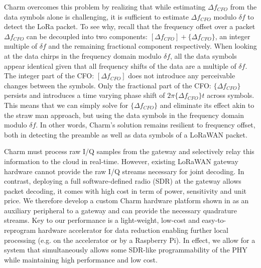 Charm overcomes this problem by realizing that while estimating $\Delta
f_{CFO}$ from the data symbols alone is challenging, it is sufficient to
estimate $\Delta f_{CFO}$ modulo $\delta f$ to detect the LoRa packet. To see
why, recall that the frequency offset over a packet $\Delta f_{CFO}$ can be
decoupled into two components: $[\Delta f_{CFO}] + \{\Delta f_{CFO}\}$, an
integer multiple of $\delta f$ and the remaining fractional component
respectively. When looking at the data chirps in the frequency domain modulo
$\delta f$, all the data symbols appear identical given that all frequency
shifts of the data are a multiple of $\delta f$. The integer part of the CFO:
$[\Delta f_{CFO}]$ does not introduce any perceivable changes between the
symbols. Only the fractional part of the CFO: $\{\Delta f_{CFO}\}$ persists
and introduces a time varying phase shift of $2 \pi \{\Delta f_{CFO}\} t$
across symbols. This means that we can simply solve for $\{\Delta f_{CFO}\}$
and eliminate its effect akin to the straw man approach, but using the data
symbols in the frequency domain modulo $\delta f$. In other words, Charm's
solution remains resilient to frequency offset, both in detecting the preamble
as well as data symbols of a LoRaWAN packet.

Charm must process raw I/Q samples from the gateway and selectively relay this
information to the cloud in real-time. However, existing LoRaWAN gateway
hardware cannot provide the raw I/Q streams necessary for joint decoding. In
contrast, deploying a full software-defined radio (SDR) at the gateway allows
packet decoding, it comes with high cost in term of power, sensitivity and
unit price. We therefore develop a custom Charm hardware platform shown in
 as an auxiliary peripheral to a gateway and can
provide the necessary quadrature streams. Key to our performance is a
light-weight, low-cost and easy-to-reprogram hardware accelerator for data
reduction enabling further local processing (e.g. on the accelerator or by a
Raspberry Pi). In effect, we allow for a system that simultaneously allows
some SDR-like programmability of the PHY while maintaining high performance
and low cost.

